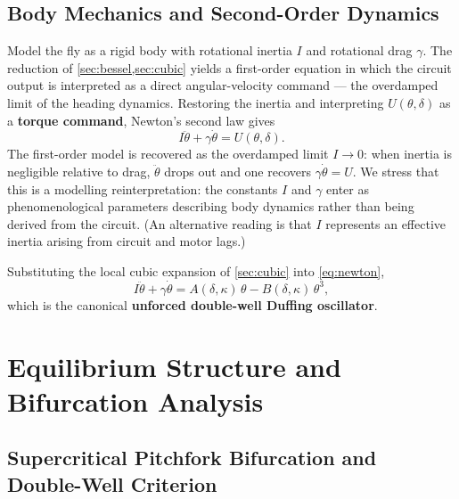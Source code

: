 \documentclass[11pt, a4paper]{article}
\begin{document}
\subsection{Body Mechanics and Second-Order Dynamics}
\label{sec:body}

Model the fly as a rigid body with rotational inertia $I$ and rotational drag
$\gamma$.  The reduction of \cref{sec:bessel,sec:cubic} yields a first-order
equation in which the circuit output is interpreted as a direct angular-velocity
command --- the overdamped limit of the heading dynamics.  Restoring the inertia
and interpreting $U(\theta, \delta)$ as a \textbf{torque command}, Newton's second law
gives
%
\begin{equation}
\label{eq:newton}
I\ddot{\theta} + \gamma\dot{\theta} = U(\theta,\delta).
\tag{19}
\end{equation}
%
The first-order model is recovered as the overdamped limit $I \to 0$: when
inertia is negligible relative to drag, $\ddot\theta$ drops out and one recovers
$\gamma\dot\theta = U$.  We stress that this is a modelling reinterpretation:
the constants $I$ and $\gamma$ enter as phenomenological parameters describing
body dynamics rather than being derived from the circuit.  (An alternative
reading is that $I$ represents an effective inertia arising from circuit and
motor lags.)

Substituting the local cubic expansion of \cref{sec:cubic} into
\cref{eq:newton},
%
\begin{equation}
\label{eq:duffing-unforced}
I\ddot\theta + \gamma\dot\theta = A(\delta,\kappa)\,\theta - B(\delta,\kappa)\,\theta^3,
\tag{20}
\end{equation}
%
which is the canonical \textbf{unforced double-well Duffing oscillator}.


\section{Equilibrium Structure and Bifurcation Analysis}
\label{sec:bifurcation}

\subsection{Supercritical Pitchfork Bifurcation and Double-Well Criterion}
\label{sec:pitchfork}
\end{document}
